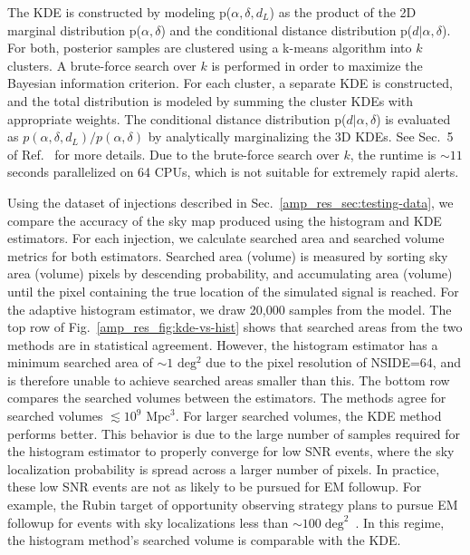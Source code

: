 \begin{refsection}
The KDE is constructed by modeling p($\alpha, \delta, d_L$) as the product of the 2D marginal distribution p($\alpha, \delta$) and the conditional distance distribution p($d \vert \alpha, \delta$). 
For both, posterior samples are clustered using a k-means algorithm into $k$ clusters. 
A brute-force search over $k$ is performed in order to maximize the Bayesian information criterion. 
For each cluster, a separate KDE is constructed, and the total distribution is modeled by summing the cluster KDEs with appropriate weights. 
The conditional distance distribution p($d \vert \alpha, \delta$) is evaluated as $p(\alpha, \delta, d_L) / p(\alpha, \delta)$ by analytically marginalizing the 3D KDEs. 
See Sec.~5 of Ref.~\cite{Singer_2016} for more details. 
Due to the brute-force search over $k$, the runtime is $\sim 11$ seconds parallelized on 64 CPUs, which is not suitable for extremely rapid alerts.


Using the dataset of injections described in Sec.~\ref{amp_res_sec:testing-data}, we compare the accuracy of the \amplfi sky map produced using the histogram and KDE estimators. 
For each injection, we calculate searched area and searched volume metrics for both estimators. 
Searched area (volume) is measured by sorting sky area (volume) pixels by descending probability, and accumulating area (volume) until the pixel containing the true location of the simulated signal is reached. 
For the adaptive histogram estimator, we draw 20,000 samples from the model. 
The top row of Fig.~\ref{amp_res_fig:kde-vs-hist} shows that searched areas from the two methods are in statistical agreement.
However, the histogram estimator has a minimum searched area of $\sim 1$ $\mathrm{deg^2}$ due to the pixel resolution of NSIDE=64, and is therefore unable to achieve searched areas smaller than this. 
The bottom row compares the searched volumes between the estimators. 
The methods agree for searched volumes $\lesssim 10^9$ $\mathrm{Mpc}^3$. 
For larger searched volumes, the KDE method performs better. 
This behavior is due to the large number of samples required for the histogram estimator to properly converge for low SNR events, where the sky localization probability is spread across a larger number of pixels. 
In practice, these low SNR events are not as likely to be pursued for EM followup. 
For example, the Rubin target of opportunity observing strategy plans to pursue EM followup for events with sky localizations less than $\sim 100\;\text{deg}^2$~\cite{andreoni2024rubin2024envisioningvera}.
In this regime, the histogram method's searched volume is comparable with the KDE. 



\end{refsection}
